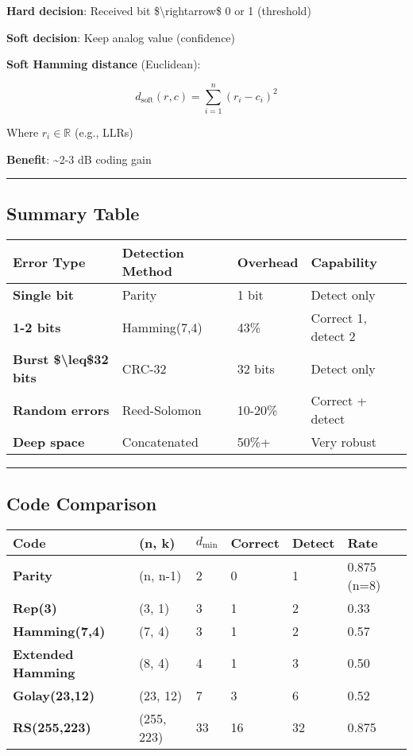 \textbf{Hard decision}: Received bit \$\textbackslash rightarrow\$ 0 or
1 (threshold)

\textbf{Soft decision}: Keep analog value (confidence)

\textbf{Soft Hamming distance} (Euclidean):

\[
d_{\text{soft}}(r, c) = \sum_{i=1}^{n} (r_i - c_i)^2
\]

Where \(r_i \in \mathbb{R}\) (e.g., LLRs)

\textbf{Benefit}: \textasciitilde2-3 dB coding gain

\begin{center}\rule{0.5\linewidth}{0.5pt}\end{center}

\subsection{Summary Table}\label{summary-table}

{\def\LTcaptype{} %
\begin{longtable}[]{@{}llll@{}}
\toprule\noalign{}
Error Type & Detection Method & Overhead & Capability \\
\midrule\noalign{}
\endhead
\bottomrule\noalign{}
\endlastfoot
\textbf{Single bit} & Parity & 1 bit & Detect only \\
\textbf{1-2 bits} & Hamming(7,4) & 43\% & Correct 1, detect 2 \\
\textbf{Burst \$\textbackslash leq\$32 bits} & CRC-32 & 32 bits & Detect
only \\
\textbf{Random errors} & Reed-Solomon & 10-20\% & Correct + detect \\
\textbf{Deep space} & Concatenated & 50\%+ & Very robust \\
\end{longtable}
}

\begin{center}\rule{0.5\linewidth}{0.5pt}\end{center}

\subsection{Code Comparison}\label{code-comparison}

{\def\LTcaptype{} %
\begin{longtable}[]{@{}llllll@{}}
\toprule\noalign{}
Code & (n, k) & \(d_{\min}\) & Correct & Detect & Rate \\
\midrule\noalign{}
\endhead
\bottomrule\noalign{}
\endlastfoot
\textbf{Parity} & (n, n-1) & 2 & 0 & 1 & 0.875 (n=8) \\
\textbf{Rep(3)} & (3, 1) & 3 & 1 & 2 & 0.33 \\
\textbf{Hamming(7,4)} & (7, 4) & 3 & 1 & 2 & 0.57 \\
\textbf{Extended Hamming} & (8, 4) & 4 & 1 & 3 & 0.50 \\
\textbf{Golay(23,12)} & (23, 12) & 7 & 3 & 6 & 0.52 \\
\textbf{RS(255,223)} & (255, 223) & 33 & 16 & 32 & 0.875 \\
\end{longtable}
}

